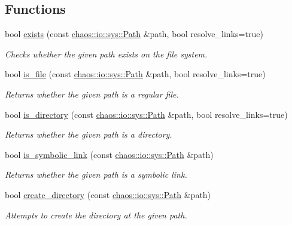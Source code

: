 \subsection*{Functions}
\begin{DoxyCompactItemize}
\item 
bool \hyperlink{namespacechaos_1_1io_1_1sys_aea7e02607d55f1683edaff9a2a459a28}{exists} (const \hyperlink{classchaos_1_1io_1_1sys_1_1_path}{chaos\+::io\+::sys\+::\+Path} \&path, bool resolve\+\_\+links=true)
\begin{DoxyCompactList}\small\item\em Checks whether the given path exists on the file system. \end{DoxyCompactList}\item 
bool \hyperlink{namespacechaos_1_1io_1_1sys_aff0d2db920afd82a3c023d77067829ec}{is\+\_\+file} (const \hyperlink{classchaos_1_1io_1_1sys_1_1_path}{chaos\+::io\+::sys\+::\+Path} \&path, bool resolve\+\_\+links=true)
\begin{DoxyCompactList}\small\item\em Returns whether the given path is a regular file. \end{DoxyCompactList}\item 
bool \hyperlink{namespacechaos_1_1io_1_1sys_ad48945ad68ee4c84a37240ebc6b5a167}{is\+\_\+directory} (const \hyperlink{classchaos_1_1io_1_1sys_1_1_path}{chaos\+::io\+::sys\+::\+Path} \&path, bool resolve\+\_\+links=true)
\begin{DoxyCompactList}\small\item\em Returns whether the given path is a directory. \end{DoxyCompactList}\item 
bool \hyperlink{namespacechaos_1_1io_1_1sys_ac47b8476aea536b08a1c7a34b4e7e28c}{is\+\_\+symbolic\+\_\+link} (const \hyperlink{classchaos_1_1io_1_1sys_1_1_path}{chaos\+::io\+::sys\+::\+Path} \&path)
\begin{DoxyCompactList}\small\item\em Returns whether the given path is a symbolic link. \end{DoxyCompactList}\item 
bool \hyperlink{namespacechaos_1_1io_1_1sys_a6bcdadf916b110395f4a2627c049da11}{create\+\_\+directory} (const \hyperlink{classchaos_1_1io_1_1sys_1_1_path}{chaos\+::io\+::sys\+::\+Path} \&path)
\begin{DoxyCompactList}\small\item\em Attempts to create the directory at the given path. \end{DoxyCompactList}\item 

\end{DoxyCompactItemize}
